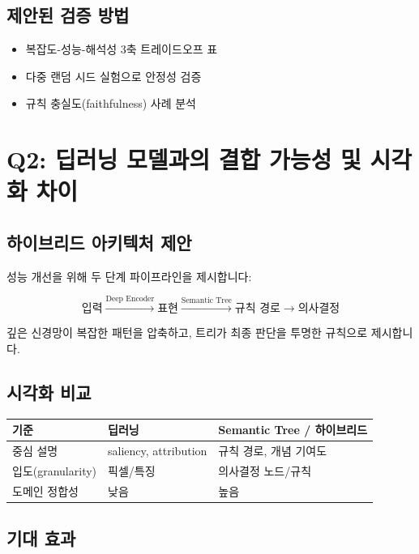 \documentclass[11pt, twocolumn]{article}
\begin{document}
\subsection{제안된 검증 방법}

\begin{itemize}
    \item 복잡도-성능-해석성 3축 트레이드오프 표
    \item 다중 랜덤 시드 실험으로 안정성 검증
    \item 규칙 충실도(faithfulness) 사례 분석
\end{itemize}

\section{Q2: 딥러닝 모델과의 결합 가능성 및 시각화 차이}

\subsection{하이브리드 아키텍처 제안}

성능 개선을 위해 두 단계 파이프라인을 제시합니다:

\[
\text{입력} \xrightarrow{\text{Deep Encoder}} \text{표현} \xrightarrow{\text{Semantic Tree}} \text{규칙 경로} \rightarrow \text{의사결정}
\]

깊은 신경망이 복잡한 패턴을 압축하고, 트리가 최종 판단을 투명한 규칙으로 제시합니다.

\subsection{시각화 비교}

\begin{table}[h]
    \centering
    \small
    \begin{tabular}{|l|l|l|}
    \hline
    \textbf{기준} & \textbf{딥러닝} & \textbf{Semantic Tree / 하이브리드} \\
    \hline
    중심 설명 & saliency, attribution & 규칙 경로, 개념 기여도 \\
    \hline
    입도(granularity) & 픽셀/특징 & 의사결정 노드/규칙 \\
    \hline
    도메인 정합성 & 낮음 & 높음 \\
    \hline
    \end{tabular}
\end{table}

\subsection{기대 효과}
\end{document}
